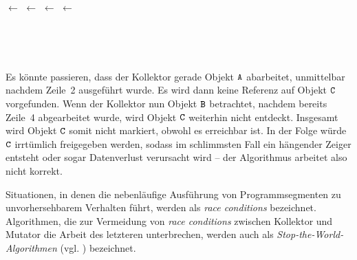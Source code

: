 \begin{center}
\begin{minipage}{0.3\textwidth}
	\centering
	\begin{algorithmic}[1]
		\State {} $\gets$ 
		\State {} $\gets$ \Null
		\State {} $\gets$ 
		\State {} $\gets$ \Null
	\end{algorithmic}
\end{minipage}~
\begin{minipage}{0.3\textwidth}
	\centering
	
\end{minipage}~
\begin{minipage}{0.3\textwidth}
	\centering
	
\end{minipage}
\end{center}

Es könnte passieren, dass der Kollektor gerade Objekt $\texttt{A}$ abarbeitet, unmittelbar nachdem Zeile~2 ausgeführt wurde.
Es wird dann keine Referenz auf Objekt $\texttt{C}$ vorgefunden.
Wenn der Kollektor nun Objekt $\texttt{B}$ betrachtet, nachdem bereits Zeile~4 abgearbeitet wurde, wird Objekt $\texttt{C}$ weiterhin nicht entdeckt.
Insgesamt wird Objekt $\texttt{C}$ somit nicht markiert, obwohl es erreichbar ist.
In der Folge würde $\texttt{C}$ irrtümlich freigegeben werden, sodass im schlimmsten Fall ein hängender Zeiger entsteht oder sogar Datenverlust verursacht wird -- der Algorithmus arbeitet also nicht korrekt.

Situationen, in denen die nebenläufige Ausführung von Programmsegmenten zu unvorhersehbarem Verhalten führt, werden als \textit{race conditions} bezeichnet.
Algorithmen, die zur Vermeidung von \textit{race conditions} zwischen Kollektor und Mutator die Arbeit des letzteren unterbrechen, werden auch als \textit{Stop-the-World-Algorithmen} (vgl. \cite[S. 17]{handbook}) bezeichnet.




